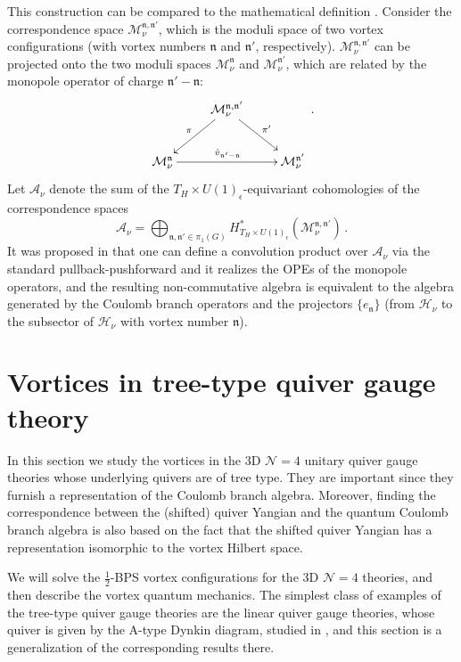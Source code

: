\documentclass[12pt,a4paper]{article}
\newcommand{\nn}{\mathfrak{n}}
\renewcommand{\(}{\left(}
\renewcommand{\)}{\right)}
\renewcommand{\(}{\left(}
\renewcommand{\)}{\right)}
\begin{document}
\medskip

This construction can be  compared to the mathematical definition \cite{Nakajima:2015txa,Braverman:2016wma, Braverman:2016pwk}.
Consider the correspondence space  $\mathcal{M}^{\nn,\nn'}_\nu$, which is the moduli space of two vortex configurations (with vortex numbers $\nn$ and $\nn'$, respectively). 
$\mathcal{M}^{\nn,\nn'}_\nu$ can be projected onto the two moduli spaces $\mathcal{M}^\nn_\nu$ and $\mathcal{M}^{\nn'}_\nu$, which are related by the monopole operator of charge $\nn'-\nn$:
\begin{equation}\label{eq:correspondence_space}
\xymatrix{
  & \mathcal{M}^{\nn,\nn'}_\nu \ar[dr]^{\pi'} \ar@{->}[dl]_-{\pi} \\
  \mathcal{M}^{\nn}_\nu \ar[rr]^{\hat{v}_{\nn'-\nn}} & &\mathcal{M}^{\nn'}_\nu
}\,.
\end{equation}
Let $\boldsymbol{\mathcal{A}}_\nu$ denote the sum of the $T_H\times U(1)_\epsilon$-equivariant cohomologies of the correspondence spaces 
\begin{equation}
\boldsymbol{\mathcal{A}}_\nu=\bigoplus_{\nn,\nn'\in \pi_1(G)} H^*_{T_{H}\times U(1)_\epsilon}(\mathcal{M}^{\nn,\nn'}_\nu )\,.
\end{equation}
It was proposed in \cite{Bullimore:2016hdc} that one can define a convolution product over $\boldsymbol{\mathcal{A}}_\nu$ via the standard pullback-pushforward and it  realizes the OPEs of the monopole operators, and the resulting non-commutative algebra is equivalent to the algebra generated by the Coulomb branch operators and the projectors $\{e_{\nn}\}$ (from $\mathcal{H}_\nu$ to the subsector of $\mathcal{H}_{\nu}$ with vortex number $\nn$).


\section{Vortices in tree-type quiver gauge theory}
\label{sec:vortex_tree_typeQGT}

In this section we study the vortices in the 3D  $\mathcal{N}=4$ unitary quiver gauge theories whose underlying quivers are of tree type. They are important since they furnish a representation of the Coulomb branch algebra. 
Moreover, finding the correspondence between the (shifted) quiver Yangian and the quantum Coulomb branch algebra is also based on the fact that the shifted quiver Yangian has a representation isomorphic to the vortex Hilbert space.

We will solve the $\frac{1}{2}$-BPS vortex configurations for the 3D $\mathcal{N}=4$ theories, and then describe the vortex quantum mechanics. 
The simplest class of examples of the tree-type quiver gauge theories are the linear quiver gauge theories, whose quiver is given by the A-type Dynkin diagram, studied in \cite{Bullimore:2016hdc}, and this section is a generalization of the corresponding results there.
\end{document}
